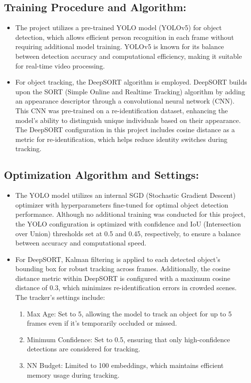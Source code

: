 \documentclass[twoside,english]{article}
\begin{document}
    \subsection{Training Procedure and Algorithm:}
    \begin{itemize}
    \setlength{\itemsep}{0.5mm}
        \item The project utilizes a pre-trained YOLO model (YOLOv5) for object detection, which allows efficient person recognition in each frame without requiring additional model training. YOLOv5 is known for its balance between detection accuracy and computational efficiency, making it suitable for real-time video processing.
        \item For object tracking, the DeepSORT algorithm is employed. DeepSORT builds upon the SORT (Simple Online and Realtime Tracking) algorithm by adding an appearance descriptor through a convolutional neural network (CNN). This CNN was pre-trained on a re-identification dataset, enhancing the model’s ability to distinguish unique individuals based on their appearance. The DeepSORT configuration in this project includes cosine distance as a metric for re-identification, which helps reduce identity switches during tracking.
    \end{itemize}

    \vspace{-0.6cm}
    \subsection{Optimization Algorithm and Settings:}
    \begin{itemize}
    \setlength{\itemsep}{0.5mm}
        \item The YOLO model utilizes an internal SGD (Stochastic Gradient Descent) optimizer with hyperparameters fine-tuned for optimal object detection performance. Although no additional training was conducted for this project, the YOLO configuration is optimized with confidence and IoU (Intersection over Union) thresholds set at 0.5 and 0.45, respectively, to ensure a balance between accuracy and computational speed.
        \item For DeepSORT, Kalman filtering is applied to each detected object’s bounding box for robust tracking across frames. Additionally, the cosine distance metric within DeepSORT is configured with a maximum cosine distance of 0.3, which minimizes re-identification errors in crowded scenes. The tracker’s settings include:
        \begin{enumerate}[label=\roman*, font=\small]
        \setlength{\itemsep}{0.5mm}    
            \item Max Age: Set to 5, allowing the model to track an object for up to 5 frames even if it’s temporarily occluded or missed.
            \item Minimum Confidence: Set to 0.5, ensuring that only high-confidence detections are considered for tracking.
            \item NN Budget: Limited to 100 embeddings, which maintains efficient memory usage during tracking.
        \end{enumerate}
    \end{itemize}
    
\end{document}

